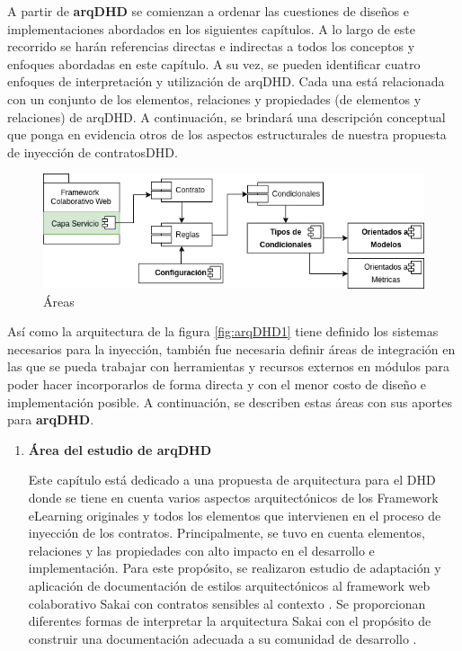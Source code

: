 {A partir de \textbf{arqDHD} se comienzan a ordenar las cuestiones de diseños e implementaciones abordados en los siguientes capítulos. A lo largo de este recorrido se harán referencias directas e indirectas a todos los conceptos y enfoques abordadas en este capítulo. A su vez, se pueden identificar cuatro enfoques de interpretación y utilización de arqDHD. Cada una está relacionada con un conjunto de los elementos, relaciones y propiedades (de elementos y relaciones) de arqDHD. A continuación, se brindará una descripción conceptual que ponga en evidencia otros de los aspectos estructurales de nuestra propuesta de inyección de contratosDHD.


\begin{figure}
\begin{center}
 \includegraphics[scale=0.55]{Ch2/arqAreas.png}
 \caption{Áreas } \label{fig:arqAreas}
\end{center}
\end{figure}



Así como la arquitectura de la figura \ref{fig:arqDHD1} tiene definido los sistemas necesarios para la inyección, también fue necesaria definir áreas de integración en las que se pueda trabajar con herramientas y recursos externos en módulos para poder hacer incorporarlos de forma directa y con el menor costo de diseño e implementación posible. A continuación, se describen estas áreas con sus aportes para \textbf{arqDHD}.

\begin{enumerate}

\item \textbf{Área del estudio de arqDHD}
 
Este capítulo está dedicado a una propuesta de arquitectura para el DHD donde se tiene en cuenta varios aspectos arquitectónicos de los Framework eLearning originales y todos los elementos que intervienen en el proceso de inyección de los contratos. Principalmente, se tuvo en cuenta elementos, relaciones y las propiedades con alto impacto en el desarrollo e implementación. Para este propósito, se realizaron estudio de adaptación y aplicación de documentación de estilos arquitectónicos al framework web colaborativo Sakai con contratos sensibles al contexto \cite{arqDHD21}. Se proporcionan diferentes formas de interpretar la arquitectura Sakai con el propósito de construir una documentación adecuada a su comunidad de desarrollo \cite{arqDHD18}.


\end{enumerate}}

